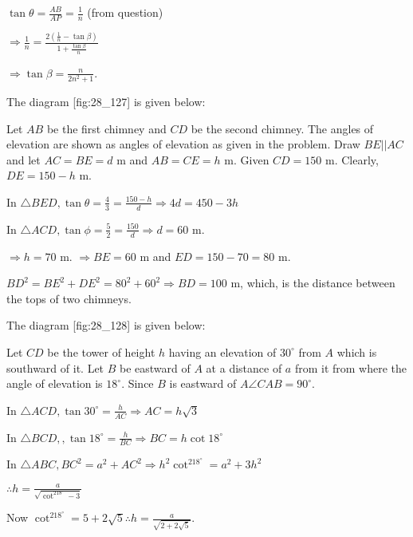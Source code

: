   $\tan\theta = \frac{AB}{AP} = \frac{1}{n}$ (from question)

  $\Rightarrow \frac{1}{n} = \frac{2\left(\frac{1}{n} - \tan\beta\right)}{1 + \frac{\tan\beta}{n}}$

  $\Rightarrow \tan\beta = \frac{n}{2n^2 + 1}$.

\item The diagram [fig:28_127] is given below:

  \startplacefigure[reference=fig:28_127]
    \externalfigure[28_127.pdf]
  \stopplacefigure

  Let $AB$ be the first chimney and $CD$ be the second chimney. The angles of elevation are
  shown as angles of elevation as given in the problem. Draw $BE||AC$ and let $AC = BE = d$ m
  and $AB = CE = h$ m. Given $CD = 150$ m. Clearly, $DE = 150 - h$ m.

  In $\triangle BED, \tan\theta = \frac{4}{3} = \frac{150 - h}{d} \Rightarrow 4d = 450 - 3h$

  In $\triangle ACD, \tan\phi = \frac{5}{2} = \frac{150}{d} \Rightarrow d = 60$ m.

  $\Rightarrow h = 70$ m. $\Rightarrow BE = 60$ m and $ED = 150 - 70 = 80$ m.

  $BD^2 = BE^2 + DE^2 = 80^2 + 60^2 \Rightarrow BD = 100$ m, which, is the distance between the tops
  of two chimneys.

\item The diagram [fig:28_128] is given below:

  \startplacefigure[reference=fig:28_128]
    \externalfigure[28_128.pdf]
  \stopplacefigure

  Let $CD$ be the tower of height $h$ having an elevation of $30^\circ$ from $A$
  which is southward of it. Let $B$ be eastward of $A$ at a distance of $a$ from it
  from where the angle of elevation is $18^\circ$. Since $B$ is eastward of $A
  \angle CAB = 90^\circ$.

  In $\triangle ACD, \tan 30^\circ = \frac{h}{AC} \Rightarrow AC = h\sqrt{3}$

  In $\triangle BCD,, \tan18^\circ = \frac{h}{BC} \Rightarrow BC = h\cot18^\circ$

  In $\triangle ABC, BC^2 = a^2 + AC^2 \Rightarrow h^2\cot^218^\circ = a^2 + 3h^2$

  $\therefore h = \frac{a}{\sqrt{\cot^218^\circ - 3}}$

  Now $\cot^218^\circ = 5 + 2\sqrt{5} \therefore h = \frac{a}{\sqrt{2 + 2\sqrt{5}}}$.

